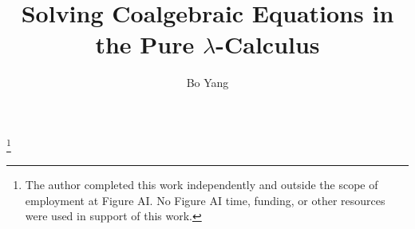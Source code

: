 


\title{Solving Coalgebraic Equations in the Pure $\lambda$-Calculus}

\author{Bo Yang}
\thanks{The author completed this work independently and outside the scope of employment at Figure AI. No Figure AI time, funding, or other resources were used in support of this work.}

